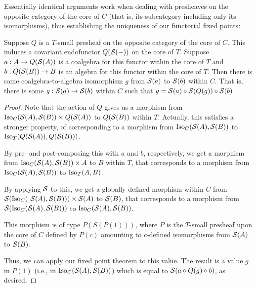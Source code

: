 Essentially identical arguments work when dealing with presheaves on the opposite category of the core of $C$ (that is, its subcategory including only its isomorphisms), thus establishing the uniqueness of our functorial fixed points:

\begin{theorem}\label{CoreCoalgToAlgExist}
Suppose $Q$ is a $T$-small presheaf on the opposite category of the core of $C$. This induces a covariant endofunctor $Q(\mathcal{S}(-))$ on the core of $T$. Suppose $a : A \to Q(\mathcal{S}(A))$ is a coalgebra for this functor within the core of $T$ and $b : Q(\mathcal{S}(B)) \to B$ is an algebra for this functor within the core of $T$. Then there is some coalgebra-to-algebra isomorphism $g$ from $\mathcal{S}(a)$ to $\mathcal{S}(b)$ within $C$. That is, there is some $g : \mathcal{S}(a) \to \mathcal{S}(b)$ within $C$ such that $g = \mathcal{S}(a) \circ \mathcal{S}(Q(g)) \circ \mathcal{S}(b)$.
\end{theorem}
\begin{proof}
Note that the action of $Q$ gives us a morphism from $\operatorname{Iso}_{C}(\mathcal{S}(A), \mathcal{S}(B)) \times Q(\mathcal{S}(A))$ to $Q(\mathcal{S}(B))$ within $T$. Actually, this satisfies a stronger property, of corresponding to a morphism from $\operatorname{Iso}_{C}(\mathcal{S}(A), \mathcal{S}(B))$ to $\operatorname{Iso}_T(Q(\mathcal{S}(A)), Q(\mathcal{S}(B)))$.

By pre- and post-composing this with $a$ and $b$, respectively, we get a morphism from $\operatorname{Iso}_C(\mathcal{S}(A), \mathcal{S}(B)) \times A$ to $B$ within $T$, that corresponds to a morphism from $\operatorname{Iso}_C(\mathcal{S}(A), \mathcal{S}(B))$ to $\operatorname{Iso}_T(A, B)$.

By applying $\mathcal{S}$ to this, we get a globally defined morphism within $C$ from $\mathcal{S}(\operatorname{Iso}_C($ $\mathcal{S}(A), \mathcal{S}(B))) \times \mathcal{S}(A)$ to $\mathcal{S}(B)$, that corresponds to a morphism from $\mathcal{S}(\operatorname{Iso}_C(\mathcal{S}(A), \mathcal{S}(B)))$ to $\operatorname{Iso}_C(\mathcal{S}(A), \mathcal{S}(B))$.

This morphism is of type $P(S(P(1)))$, where $P$ is the $T$-small presheaf upon the core of $C$ defined by $P(c)$ amounting to $c$-defined isomorphisms from $\mathcal{S}(A)$ to $\mathcal{S}(B)$.

Thus, we can apply our fixed point theorem  to this value. The result is a value $g$ in $P(1)$ (i.e., in $\operatorname{Iso}_C(\mathcal{S}(A), \mathcal{S}(B))$) which is equal to $\mathcal{S}(a \circ Q(g) \circ b)$, as desired.

\end{proof}

